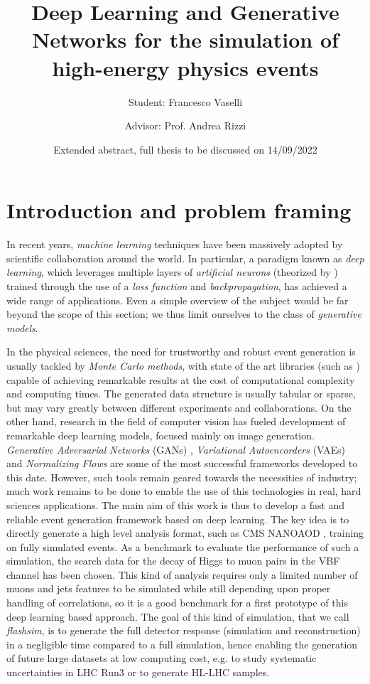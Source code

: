 \documentclass{scrartcl} %
\title{Deep Learning and Generative Networks for the simulation of high-energy physics events}
\author{Student: Francesco Vaselli \and
	Advisor: Prof. Andrea Rizzi}
\date{Extended abstract, full thesis to be discussed on 14/09/2022}
\newcommand{\quickcharcount}[1]{%
	\immediate\write18{texcount -1 -sum -merge -char #1.tex > #1-chars.sum}%
	\openin\tmp=#1-chars.sum%
	\read\tmp to \thechar%
	\closein\tmp%
}
\newcommand{\quickwordcount}[1]{%
	\immediate\write18{texcount -1 -sum -merge #1.tex > #1-words.sum}%
	\openin\tmp=#1-words.sum%
	\read\tmp to \theword%
	\closein\tmp%
}
\begin{document}
	\maketitle
	
	
	\section*{Introduction and problem framing}
	In recent years, \emph{machine learning} techniques have been massively adopted by scientific collaboration around the world. In particular, a paradigm known as \emph{deep learning}, which leverages multiple layers of \emph{artificial neurons} (theorized by \cite{Rosenblatt1958ThePA}) trained through the use of a \emph{loss function} and \emph{backpropagation}, has achieved a wide range of applications. Even a simple overview of the subject would be far beyond the scope of this section; we thus limit ourselves to the class of \emph{generative models}.
	
	In the physical sciences, the need for trustworthy and robust event generation is usually tackled by \emph{Monte Carlo methods}, with state of the art libraries (such as \cite{AGOSTINELLI2003250}) capable of achieving remarkable results at the cost of computational complexity and computing times. The generated data structure is usually tabular or sparse, but may vary greatly between different experiments and collaborations. On the other hand, research in the field of computer vision has fueled development of remarkable deep learning models, focused mainly on image generation. \emph{Generative Adversarial Networks} (GANs) \cite{goodfellow2014generative}, \emph{Variational Autoencorders} (VAEs) \cite{kingma2014autoencoding} and \emph{Normalizing Flows} \cite{rezende2016variational} are some of the most successful frameworks developed to this date. However, such tools remain geared towards the necessities of industry; much work remains to be done to enable the use of this technologies in real, hard sciences applications.
	The main aim of this work is thus to develop a fast and reliable event generation framework based on deep learning. The key idea is to directly generate a high level analysis format, such as CMS NANOAOD \cite{2019EPJWC.21406021R}, training on fully simulated events. As a benchmark to evaluate the performance of such a simulation, the search data for the decay of Higgs to muon pairs in the VBF channel has been chosen. This kind of analysis requires only a limited number of muons and jets features to be simulated while still depending upon proper handling of correlations, so it is a good benchmark for a first prototype of this deep learning based approach. The goal of this kind of simulation, that we call \emph{flashsim}, is to generate the full detector response (simulation and reconstruction) in a negligible time compared to a full simulation, hence enabling the generation of future large datasets at low computing cost, e.g. to study systematic uncertainties in LHC Run3 or to generate HL-LHC samples. 
	
\end{document}
